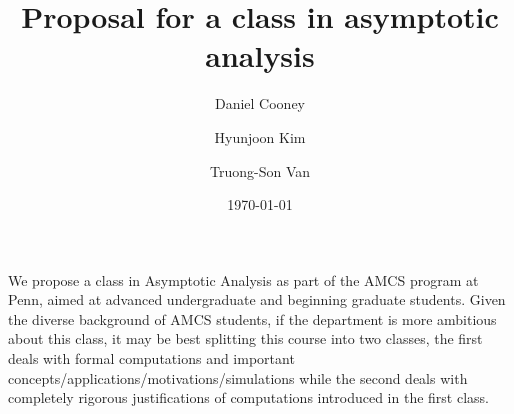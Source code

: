 \documentclass[12pt]{amsart}
\title{ Proposal for a class in asymptotic analysis }
\author{Daniel Cooney}
\author{Hyunjoon Kim}
\author{Truong-Son Van}
\date{\today}
\begin{document}
\maketitle

We propose a class in Asymptotic Analysis as part of the AMCS program at Penn,
aimed at advanced undergraduate and beginning graduate students.
Given the diverse background of AMCS students,
if the department is more ambitious about this class, it may be best splitting 
this course into two classes, the first deals with formal computations 
and important concepts/applications/motivations/simulations while the second
deals with completely rigorous justifications of computations introduced in the
first class.





\printbibliography 
%
%
\end{document}
